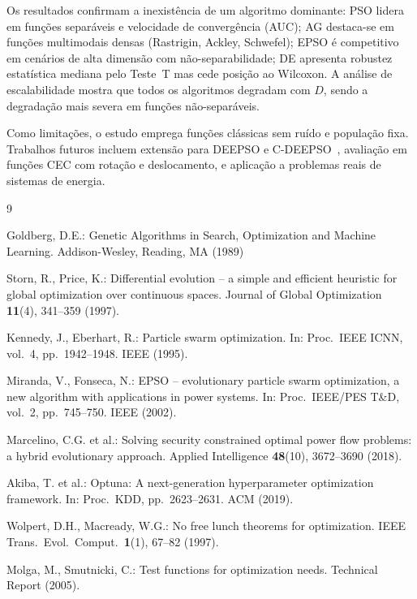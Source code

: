\documentclass[runningheads]{llncs}
\begin{document}
Os resultados confirmam a inexistência de um algoritmo dominante: PSO
lidera em funções separáveis e velocidade de convergência (AUC);
AG destaca-se em funções multimodais densas (Rastrigin, Ackley,
Schwefel); EPSO é competitivo em cenários de alta dimensão com
não-separabilidade; DE apresenta robustez estatística mediana pelo
Teste~T mas cede posição ao Wilcoxon. A análise de escalabilidade
mostra que todos os algoritmos degradam com $D$, sendo a degradação
mais severa em funções não-separáveis.

Como limitações, o estudo emprega funções clássicas sem ruído e
população fixa. Trabalhos futuros incluem extensão para DEEPSO e
C-DEEPSO~\cite{marcelino2018}, avaliação em funções CEC com rotação
e deslocamento, e aplicação a problemas reais de sistemas de energia.

\begin{thebibliography}{9}

Goldberg, D.E.: Genetic Algorithms in Search, Optimization and
Machine Learning. Addison-Wesley, Reading, MA (1989)

Storn, R., Price, K.: Differential evolution -- a simple and efficient
heuristic for global optimization over continuous spaces.
Journal of Global Optimization \textbf{11}(4), 341--359 (1997).

Kennedy, J., Eberhart, R.: Particle swarm optimization.
In: Proc.\ IEEE ICNN, vol.~4, pp.~1942--1948. IEEE (1995).

Miranda, V., Fonseca, N.: EPSO -- evolutionary particle swarm
optimization, a new algorithm with applications in power systems.
In: Proc.\ IEEE/PES T\&D, vol.~2, pp.~745--750. IEEE (2002).

Marcelino, C.G. et al.: Solving security constrained optimal power
flow problems: a hybrid evolutionary approach.
Applied Intelligence \textbf{48}(10), 3672--3690 (2018).

Akiba, T. et al.: Optuna: A next-generation hyperparameter
optimization framework. In: Proc.\ KDD, pp.~2623--2631. ACM (2019).

Wolpert, D.H., Macready, W.G.: No free lunch theorems for
optimization. IEEE Trans.\ Evol.\ Comput.\ \textbf{1}(1),
67--82 (1997). 

Molga, M., Smutnicki, C.: Test functions for optimization needs.
Technical Report (2005).

\end{thebibliography}
\end{document}

